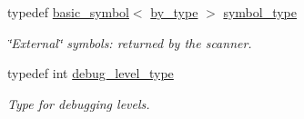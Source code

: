 \begin{DoxyCompactItemize}
typedef \hyperlink{structyy_1_1genesyspp__parser_1_1basic__symbol}{basic\-\_\-symbol}$<$ \hyperlink{structyy_1_1genesyspp__parser_1_1by__type}{by\-\_\-type} $>$ \hyperlink{classyy_1_1genesyspp__parser_a5b9a172d481d4a62555ee11a7957e789}{symbol\-\_\-type}
\begin{DoxyCompactList}\small\item\em \char`\"{}\-External\char`\"{} symbols\-: returned by the scanner. \end{DoxyCompactList}\item 
typedef int \hyperlink{classyy_1_1genesyspp__parser_a0b40fe1ee9c8daa745e0acbcf25dca16}{debug\-\_\-level\-\_\-type}
\begin{DoxyCompactList}\small\item\em Type for debugging levels. \end{DoxyCompactList}\end{DoxyCompactItemize}
